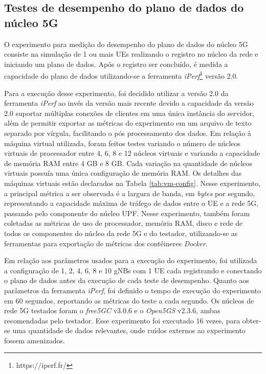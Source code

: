 \subsection{Testes de desempenho do plano de dados do núcleo 5G}

O experimento para medição do desempenho do plano de dados do núcleo 5G consiste na simulação de 1 ou mais UEs realizando o registro no núcleo da rede e iniciando um plano de dados. Após o registro ser concluído, é medida a capacidade do plano de dados utilizando-se a ferramenta \textit{iPerf}\footnote{https://iperf.fr/} versão 2.0.

Para a execução desse experimento, foi decidido utilizar a versão 2.0 da ferramenta \textit{iPerf} ao invés da versão mais recente devido a capacidade da versão 2.0 suportar múltiplas conexões de clientes em uma única instância do servidor, além de permitir exportar as métricas do experimento em um arquivo de texto separado por vírgula, facilitando o pós processamento dos dados.
Em relação à máquina virtual utilizada, foram feitos testes variando o número de núcleos virtuais de processador entre 4, 6, 8 e 12 núcleos virtuais e variando a capacidade de memória RAM entre 4 GB e 8 GB. Cada variação na quantidade de núcleos virtuais possuía uma única configuração de memória RAM. Os detalhes das máquinas virtuais estão declarados na Tabela \ref{tab:vm-config}. 
Nesse experimento, a principal métrica a ser observada é a largura de banda, em \textit{bytes} por segundo, representando a capacidade máxima de tráfego de dados entre o UE e a rede 5G, passando pelo componente do núcleo UPF.
Nesse experimento, também foram coletadas as métricas de uso de processador, memória RAM, disco e rede de todos os componentes do núcleo da rede 5G e do testador, utilizando-se as ferramentas para exportação de métricas dos contêineres \textit{Docker}.

Em relação aos parâmetros usados para a execução do experimento, foi utilizada a configuração de 1, 2, 4, 6, 8 e 10 gNBs com 1 UE cada registrando e conectando o plano de dados antes da execução de cada teste de desempenho. Quanto aos parâmetros da ferramenta \textit{iPerf}, foi definido o tempo de execução do experimento em 60 segundos, reportando as métricas do teste a cada segundo.
Os núcleos de rede 5G testados foram o \textit{free5GC} v3.0.6 e o \textit{Open5GS} v2.3.6, ambas recomendadas pelo testador.
Esse experimento foi executado 16 vezes, para obter-se uma quantidade de dados relevantes, onde ruídos externos ao experimento fossem amenizados.

